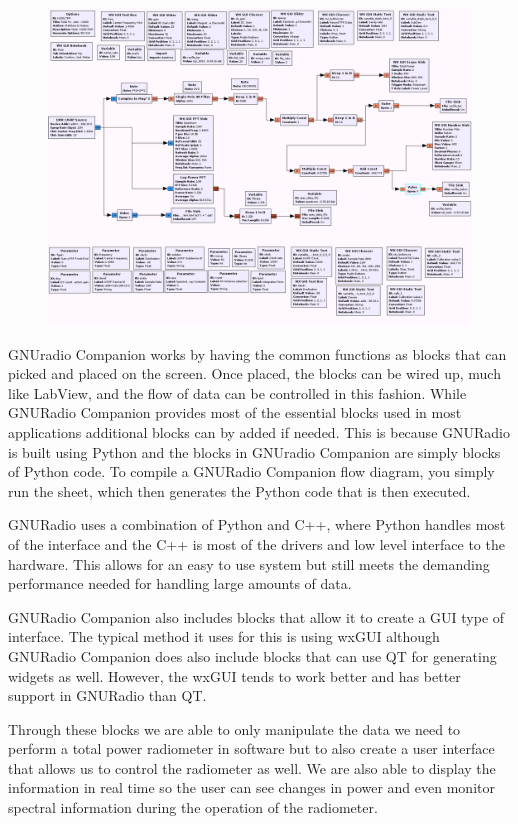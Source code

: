 {\begin{figure}[h!tb] 
\centering
\includegraphics[width=17cm]{Images/N200_radiometer_grc.png}
\label{N200_GRC}
\end{figure}
}

GNUradio Companion works by having the common functions as blocks that can picked and placed on the screen.  Once placed, the blocks can be wired up, much like LabView, and the flow of data can be controlled in this fashion.  While GNURadio Companion provides most of the essential blocks used in most applications additional blocks can by added if needed.  This is because GNURadio is built using Python and the blocks in GNUradio Companion are simply blocks of Python code.  To compile a GNURadio Companion flow diagram, you simply run the sheet, which then generates the Python code that is then executed.  

GNURadio uses a combination of Python and C++, where Python handles most of the interface and the C++ is most of the drivers and low level interface to the hardware.  This allows for an easy to use system but still meets the demanding performance needed for handling large amounts of data.  

GNURadio Companion also includes blocks that allow it to create a GUI type of interface.  The typical method it uses for this is using wxGUI although GNURadio Companion does also include blocks that can use QT for generating widgets as well.  However, the wxGUI tends to work better and has better support in GNURadio than QT.  

Through these blocks we are able to only manipulate the data we need to perform a total power radiometer in software but to also create a user interface that allows us to control the radiometer as well.  We are also able to display the information in real time so the user can see changes in power and even monitor spectral information during the operation of the radiometer. 


